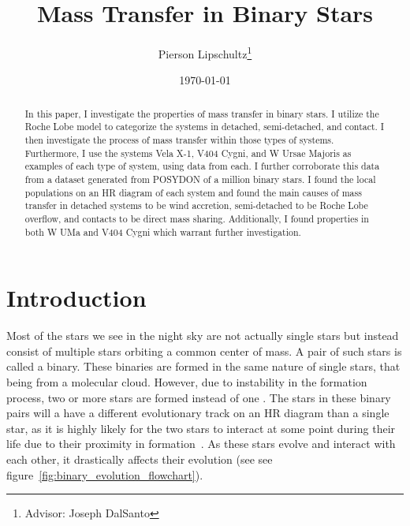 \documentclass[12pt, a4paper]{article}
\title{Mass Transfer in Binary Stars}
\author{Pierson Lipschultz\thanks{Advisor: Joseph DalSanto}}
\date{\today}
\begin{document}
\maketitle
\begin{abstract}
    \normalsize
    In this paper, I investigate the properties of mass transfer in binary stars. I utilize the Roche Lobe model to categorize the systems in detached, semi-detached, and contact. I then investigate the process of mass transfer within those types of systems. Furthermore, I use the systems Vela X-1, V404 Cygni, and W Ursae Majoris as examples of each type of system, using data from each. I further corroborate this data from a dataset generated from POSYDON of a million binary stars. I found the local populations on an HR diagram of each system and found the main causes of mass transfer in detached systems to be wind accretion, semi-detached to be Roche Lobe overflow, and contacts to be direct mass sharing. Additionally, I found properties in both W UMa and V404 Cygni which warrant further investigation.

\end{abstract}

\section{Introduction} %

    Most of the stars we see in the night sky are not actually single stars but instead consist of multiple stars orbiting a common center of mass. A pair of such stars is called a binary. These binaries are formed in the same nature of single stars, that being from a molecular cloud. However, due to instability in the formation process, two or more stars are formed instead of one \parencite{Offner_2016}. The stars in these binary pairs will a have a different evolutionary track on an HR diagram than a single star, as it is highly likely for the two stars to interact at some point during their life due to their proximity in formation~\parencite{TaurisvandenHeuvel+2023}. As these stars evolve and interact with each other, it drastically affects their evolution (see see figure~\ref{fig:binary_evolution_flowchart}).
\end{document}
